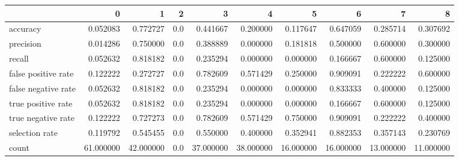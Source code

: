 \begin{tabular}{lrrrrrrrrr}
\toprule
{} &          0 &          1 &    2 &          3 &          4 &          5 &          6 &          7 &          8 \\
\midrule
accuracy            &   0.052083 &   0.772727 &  0.0 &   0.441667 &   0.200000 &   0.117647 &   0.647059 &   0.285714 &   0.307692 \\
precision           &   0.014286 &   0.750000 &  0.0 &   0.388889 &   0.000000 &   0.181818 &   0.500000 &   0.600000 &   0.300000 \\
recall              &   0.052632 &   0.818182 &  0.0 &   0.235294 &   0.000000 &   0.000000 &   0.166667 &   0.600000 &   0.125000 \\
false positive rate &   0.122222 &   0.272727 &  0.0 &   0.782609 &   0.571429 &   0.250000 &   0.909091 &   0.222222 &   0.600000 \\
false negative rate &   0.052632 &   0.818182 &  0.0 &   0.235294 &   0.000000 &   0.000000 &   0.833333 &   0.400000 &   0.125000 \\
true positive rate  &   0.052632 &   0.818182 &  0.0 &   0.235294 &   0.000000 &   0.000000 &   0.166667 &   0.600000 &   0.125000 \\
true negative rate  &   0.122222 &   0.727273 &  0.0 &   0.782609 &   0.571429 &   0.750000 &   0.909091 &   0.222222 &   0.400000 \\
selection rate      &   0.119792 &   0.545455 &  0.0 &   0.550000 &   0.400000 &   0.352941 &   0.882353 &   0.357143 &   0.230769 \\
count               &  61.000000 &  42.000000 &  0.0 &  37.000000 &  38.000000 &  16.000000 &  16.000000 &  13.000000 &  11.000000 \\
\bottomrule
\end{tabular}
